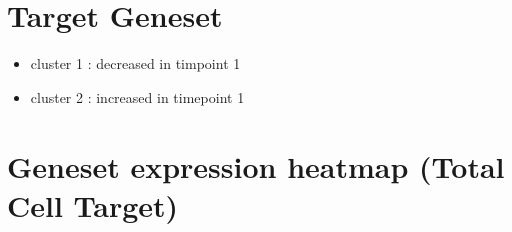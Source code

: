 \documentclass[
  12pt,
]{article}
\providecommand{\tightlist}{%
  \setlength{\itemsep}{0pt}\setlength{\parskip}{0pt}}
\begin{document}
\hypertarget{target-geneset}{%
\section{Target Geneset}\label{target-geneset}}

\begin{itemize}
\tightlist
\item
  cluster 1 : decreased in timpoint 1
\item
  cluster 2 : increased in timepoint 1
\end{itemize}

\hypertarget{geneset-expression-heatmap-total-cell-target}{%
\section{Geneset expression heatmap (Total Cell
Target)}\label{geneset-expression-heatmap-total-cell-target}}
\end{document}
